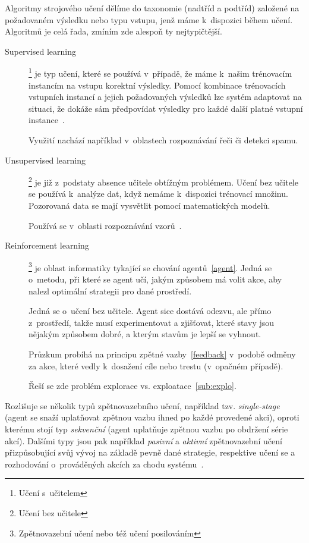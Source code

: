 \documentclass[thesis=M,czech]{FITthesis}[2014/05/07]
\begin{document}
Algoritmy strojového učení dělíme do taxonomie (nadtříd a podtříd) založené na požadovaném výsledku nebo typu vstupu, jenž máme k~dispozici během učení. Algoritmů je celá řada, zmíním zde alespoň ty nejtypičtější. 

\begin{description}
  \item[Supervised learning]\footnote{Učení s~učitelem} je typ učení, které se používá v~případě, že máme k~našim trénovacím instancím na vstupu korektní výsledky. Pomocí kombinace trénovacích vstupních instancí a jejich požadovaných výsledků lze systém adaptovat na situaci, že dokáže sám předpovídat výsledky pro každé další platné vstupní instance~\cite{aihorizon}.
  
  Využití nachází například v~oblastech rozpoznávání řeči či detekci spamu.
  \item[Unsupervised learning]\footnote{Učení bez učitele} je již z~podstaty absence učitele obtížným problémem. Učení bez učitele se používá k~analýze dat, když nemáme k~dispozici trénovací množinu. Pozorovaná data se mají vysvětlit pomocí matematických modelů.
  
  Používá se v~oblasti rozpoznávání vzorů~\cite{hlavac}.
  \item[Reinforcement learning]\footnote{Zpětnovazební učení nebo též učení posilováním} je oblast informatiky tykající se chování agentů~\ref{agent}. Jedná se o~metodu, při které se agent učí, jakým způsobem má volit akce, aby nalezl optimální strategii pro dané prostředí.
  
  Jedná se o~učení bez učitele. Agent sice dostává odezvu, ale přímo z~prostředí, takže musí experimentovat a zjišťovat, které stavy jsou nějakým způsobem dobré, a kterým stavům je lepší se vyhnout.
  
  Průzkum probíhá na principu zpětné vazby~\ref{feedback} v~podobě odměny za akce, které vedly k~dosažení cíle nebo trestu (v~opačném případě).
  
  Řeší se zde problém explorace vs. exploatace~\ref{sub:explo}. 
\end{description}

Rozlišuje se několik typů zpětnovazebního učení, například tzv. \emph{single-stage} (agent se snaží uplatňovat zpětnou vazbu ihned po každé provedené akci), oproti kterému stojí typ \emph{sekvenční} (agent uplatňuje zpětnou vazbu po obdržení série akcí). Dalšími typy jsou pak například \emph{pasivní} a \emph{aktivní} zpětnovazební učení přizpůsobující svůj vývoj na základě pevně dané strategie, respektive učení se a rozhodování o~prováděných akcích za chodu systému~\cite{reinforcement}.
\end{document}
